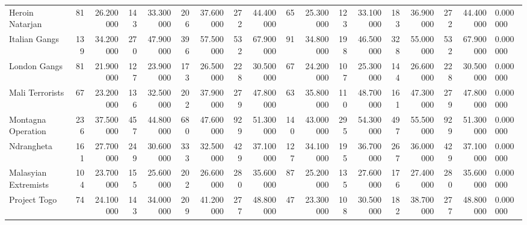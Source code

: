 \begin{tabular}{lrrrrrrrrrrrrrrrrl}
Heroin Natarjan & 81 & 26.200000 & 143 & 33.300000 & 206 & 37.600000 & 272 & 44.400000 & 65 & 25.300000 & 123 & 33.100000 & 183 & 36.900000 & 272 & 44.400000 & 0.000000 \\
Italian Gangs & 139 & 34.200000 & 270 & 47.900000 & 396 & 57.500000 & 532 & 67.900000 & 91 & 34.800000 & 198 & 46.500000 & 328 & 55.000000 & 532 & 67.900000 & 0.000000 \\
London Gangs & 81 & 21.900000 & 127 & 23.900000 & 173 & 26.500000 & 228 & 30.500000 & 67 & 24.200000 & 107 & 25.300000 & 144 & 26.600000 & 228 & 30.500000 & 0.000000 \\
Mali Terrorists & 67 & 23.200000 & 136 & 32.500000 & 202 & 37.900000 & 279 & 47.800000 & 63 & 35.800000 & 110 & 48.700000 & 161 & 47.300000 & 279 & 47.800000 & 0.000000 \\
Montagna Operation & 236 & 37.500000 & 457 & 44.800000 & 680 & 47.600000 & 929 & 51.300000 & 140 & 43.000000 & 295 & 54.300000 & 497 & 55.500000 & 929 & 51.300000 & 0.000000 \\
Ndrangheta & 161 & 27.700000 & 249 & 30.600000 & 333 & 32.500000 & 429 & 37.100000 & 127 & 34.100000 & 195 & 36.700000 & 267 & 36.000000 & 429 & 37.100000 & 0.000000 \\
Malasyian Extremists & 104 & 23.700000 & 155 & 25.600000 & 202 & 26.600000 & 280 & 35.600000 & 87 & 25.200000 & 135 & 27.600000 & 176 & 27.400000 & 280 & 35.600000 & 0.000000 \\
Project Togo & 74 & 24.100000 & 143 & 34.000000 & 209 & 41.200000 & 277 & 48.800000 & 47 & 23.300000 & 108 & 30.500000 & 182 & 38.700000 & 277 & 48.800000 & 0.000000 \\
\end{tabular}
